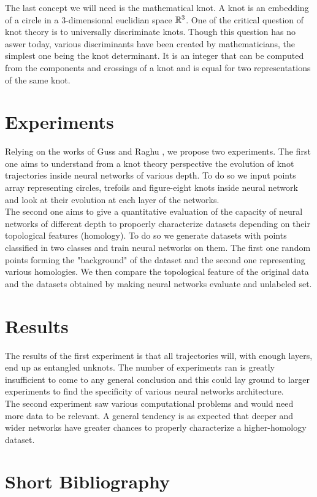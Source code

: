 \documentclass[12pt, a4paper]{article}
\begin{document}
\begin{multicols}{2}
The last concept we will need is the mathematical knot. A knot is an embedding of a circle in a $3$-dimensional euclidian space $\mathbb{R}^3$. One of the critical question of knot theory is to universally discriminate knots. Though this question has no aswer today, various discriminants have been created by mathematicians, the simplest one being the knot determinant. It is an integer that can be computed from the components and crossings of a knot and is equal for two representations of the same knot.

\section{Experiments}

Relying on the works of Guss \cite{guss_characterizing_2018} and Raghu \cite{raghu_expressive_2017}, we propose two experiments. The first one aims to understand from a knot theory perspective the evolution of knot trajectories inside neural networks of various depth. To do so we input points array representing circles, trefoils and figure-eight knots inside neural network and look at their evolution at each layer of the networks.\\

The second one aims to give a quantitative evaluation of the capacity of neural networks of different depth to propoerly characterize datasets depending on their topological features (homology). To do so we generate datasets with points classified in two classes and train neural networks on them. The first one random points forming the "background" of the dataset and the second one representing various homologies. We then compare the topological feature of the original data and the datasets obtained by making neural networks evaluate and unlabeled set. 

\section{Results}

The results of the first experiment is that all trajectories will, with enough layers, end up as entangled unknots. The number of experiments ran is greatly insufficient to come to any general conclusion and this could lay ground to larger experiments to find the specificity of various neural networks architecture. \\

The second experiment saw various computational problems and would need more data to be relevant. A general tendency is as expected that deeper and wider networks have greater chances to properly characterize a higher-homology dataset. 


\section{Short Bibliography}





\end{multicols}
\end{document}

